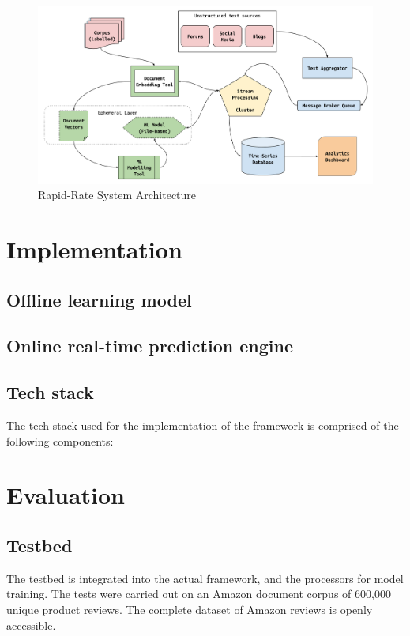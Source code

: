 \documentclass[conference]{IEEEtran}
\begin{document}
\begin{figure}[ht]
\centering
\includegraphics[width=\textwidth]{images/rapid_rate_system_arch_1.png}
\caption{Rapid-Rate System Architecture}
\label{fig:system-architecture}
\end{figure}

\vspace{5mm}

\section{Implementation}


\subsection{Offline learning model}

\subsection{Online real-time prediction engine}

\subsection{Tech stack}
The tech stack used for the implementation of the framework is comprised of the following components:

\vspace{5mm}

\section{Evaluation}

\subsection{Testbed}
The testbed is integrated into the actual framework, and the processors for model training.
The tests were carried out on an Amazon document corpus of 600,000 unique product reviews.
The complete dataset of Amazon reviews is openly accessible.
\end{document}
